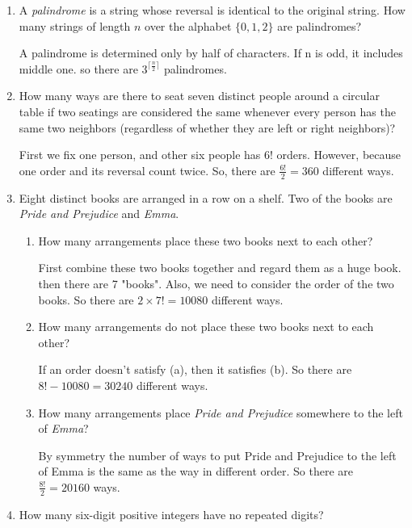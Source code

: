 \documentclass[11pt]{article}
\begin{document}
\begin{enumerate}

\item
A \emph{palindrome} is a string whose reversal is identical to the original string. How many strings of length \(n\) over the alphabet $\{0,1,2\}$ are palindromes?

A palindrome is determined only by half of characters. If n is odd, it includes middle one. so there are $3^{\lceil \frac{n}{2} \rceil}$ palindromes.

\item
How many ways are there to seat seven distinct people around a circular table if two seatings are considered the same whenever every person has the same two neighbors (regardless of whether they are left or right neighbors)?

First we fix one person, and other six people has $6!$ orders. However, because one order and its reversal count twice. So, there are $\frac{6!}{2}=360$ different ways.

\item
Eight distinct books are arranged in a row on a shelf. Two of the books are \emph{Pride and Prejudice} and \emph{Emma}.

\begin{enumerate}
    \item How many arrangements place these two books next to each other?

    First combine these two books together and regard them as a huge book. then there are 7 "books". Also, we need to consider the order of the two books. So there are $2\times7!=10080$ different ways.
    
    \item How many arrangements do not place these two books next to each other?

    If an order doesn't satisfy (a), then it satisfies (b). So there are $8!-10080=30240$ different ways.
    
    \item How many arrangements place \emph{Pride and Prejudice} somewhere to the left of \emph{Emma}?

    By symmetry the number of ways to put Pride and Prejudice to the left of Emma is the same as the way in different order. So there are $\frac{8!}{2}=20160$ ways.
    
\end{enumerate}

\item
How many six-digit positive integers have no repeated digits? 


\end{enumerate}
\end{document}
